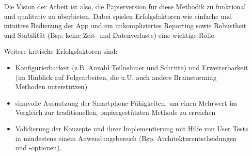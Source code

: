 Die Vision der Arbeit ist also, die Papierversion für diese Methodik zu funktional und qualitativ zu überbieten. Dabei spielen Erfolgsfaktoren wie einfache und intuitive Bedienung der App und ein unkompliziertes Reporting sowie Robustheit und Stabilität (Bsp. keine Zeit- und Datenverluste) eine wichtige Rolle.

Weitere kritische Erfolgsfaktoren sind:
\begin{itemize}
  \item Konfigurierbarkeit (z.B. Anzahl Teilnehmer und Schritte)  und Erweiterbarkeit (im Hinblick auf Folgearbeiten, die u.U. auch andere Brainstorming Methoden unterstützen)
  \item sinnvolle Ausnutzung der Smartphone-Fähigkeiten, um einen Mehrwert im Vergleich zur traditionellen, papiergestützten Methode zu erreichen
  \item Validierung der Konzepte und ihrer Implementierung mit Hilfe von User Tests in mindestens einem Anwendungsbereich (Bsp. Architekturentscheidungen und -optionen).
\end{itemize}

